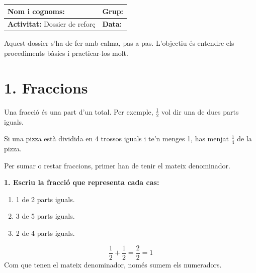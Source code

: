 \documentclass[12pt,a4paper]{article}
\begin{document}
\begingroup
\renewcommand{\arraystretch}{2}
\begin{tabularx}{\textwidth}{|X|p{4cm}|}
\hline
\textbf{Nom i cognoms:} & \textbf{Grup:} \\ \hline
\textbf{Activitat:} Dossier de reforç & \textbf{Data:} \\ \hline
\end{tabularx}
\endgroup

\vspace{0.5cm}


\begin{tcolorbox}[colback=red!5!white, colframe=red!75!black, title=Important, fonttitle=\bfseries\large]
Aquest dossier s'ha de fer amb calma, pas a pas. L'objectiu és entendre els procediments bàsics i practicar-los molt.
\end{tcolorbox}

\section*{1. Fraccions}

\begin{capsula}
Una fracció és una part d'un total. Per exemple, \(\frac{1}{2}\) vol dir una de dues parts iguals.
\end{capsula}

\begin{exemple}
Si una pizza està dividida en 4 trossos iguals i te'n menges 1, has menjat \(\frac{1}{4}\) de la pizza.
\end{exemple}

\begin{capsula}
Per sumar o restar fraccions, primer han de tenir el mateix denominador.
\end{capsula}

\textbf{1. Escriu la fracció que representa cada cas:}
\begin{enumerate}[label=\alph*)]
    \item 1 de 2 parts iguals. \vspace{0.6cm}
    \item 3 de 5 parts iguals. \vspace{0.6cm}
    \item 2 de 4 parts iguals. \vspace{0.6cm}
\end{enumerate}

\begin{exemple}
\[
\frac{1}{2} + \frac{1}{2} = \frac{2}{2} = 1
\]
Com que tenen el mateix denominador, només sumem els numeradors.
\end{exemple}
\end{document}

